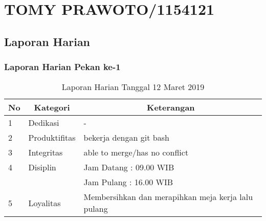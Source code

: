 \chapter{TOMY PRAWOTO/1154121}

\section{Laporan Harian}

\subsection{Laporan Harian Pekan ke-1}

\begin{table}[htp]
\caption{Laporan Harian Tanggal 12 Maret 2019}
\label{tab:lh120319}
\begin{tabular}{|l|l|l|}
\hline
\textbf{No} & \multicolumn{1}{c|}{\textbf{Kategori}} & \multicolumn{1}{c|}{\textbf{Keterangan}} \\ \hline
1 & Dedikasi & - \\ \hline
2 & Produktifitas & bekerja dengan git bash \\
3 & Integritas & able to merge/has no conflict \\ \hline
4 & Disiplin & Jam Datang : 09.00 WIB \\
 &  & Jam Pulang : 16.00 WIB \\ \hline
5 & Loyalitas & Membersihkan dan merapihkan meja kerja lalu pulang  \\ \hline
\end{tabular}
\end{table}